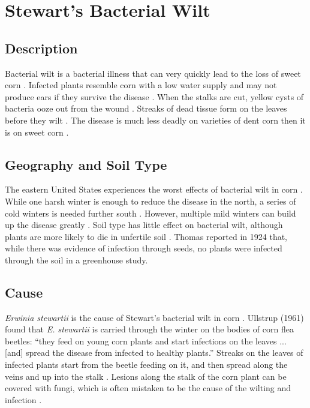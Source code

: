 \documentclass[letterpaper, 12pt]{report}
\begin{document}
\section{Stewart's Bacterial Wilt}

\subsection{Description}

Bacterial wilt is a bacterial illness that can very quickly lead to the loss of sweet corn \autocite{robert1967bacterial}. Infected plants resemble corn with a low water supply and may not produce ears if they survive the disease \autocite{ullstrup1961corn}. When the stalks are cut, yellow cysts of bacteria ooze out from the wound \autocite{ullstrup1961corn}. Streaks of dead tissue form on the leaves before they wilt \autocite{robert1967bacterial}. The disease is much less deadly on varieties of dent corn then it is on sweet corn \autocite{rand1933bacterial}.

\subsection{Geography and Soil Type}

The eastern United States experiences the worst effects of bacterial wilt in corn \autocite{ullstrup1961corn, robert1967bacterial}. While one harsh winter is enough to reduce the disease in the north, a series of cold winters is needed further south \autocite{robert1967bacterial}. However, multiple mild winters can build up the disease greatly \autocite{robert1967bacterial}. Soil type has little effect on bacterial wilt, although plants are more likely to die in unfertile soil \autocite{ullstrup1961corn, thomas1924stewart}. Thomas reported in 1924 that, while there was evidence of infection through seeds, no plants were infected through the soil in a greenhouse study.

\subsection{Cause}

\emph{Erwinia stewartii} is the cause of Stewart's bacterial wilt in corn \autocite{ullstrup1961corn}. Ullstrup (1961) found that \emph{E. stewartii} is carried through the winter on the bodies of corn flea beetles: ``they feed on young corn plants and start infections on the leaves ... [and] spread the disease from infected to healthy plants.'' Streaks on the leaves of infected plants start from the beetle feeding on it, and then spread along the veins and up into the stalk \autocite{robert1967bacterial}. Lesions along the stalk of the corn plant can be covered with fungi, which is often mistaken to be the cause of the wilting and infection \autocite{ullstrup1961corn}.
\end{document}
